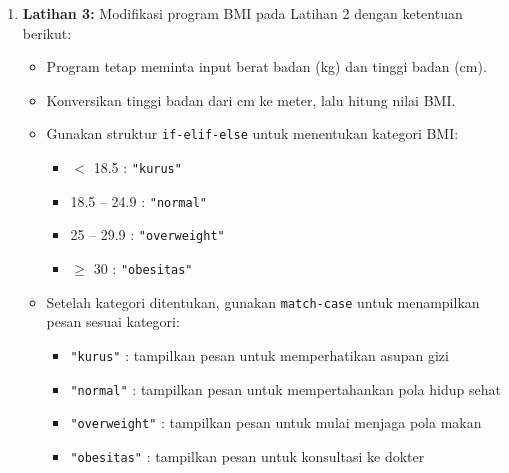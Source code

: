 \begin{enumerate}
\begin{itemize}
    \item Program meminta input berat badan (kg) dan tinggi badan (cm).
    \item Konversikan tinggi badan dari cm menjadi meter.
    \item Hitung nilai BMI menggunakan rumus di atas.
    \item Kategorikan hasilnya dengan \texttt{if-elif-else}:
    \begin{itemize}
        \item $<$ 18.5 : \texttt{Kurus}
        \item 18.5 -- 24.9 : \texttt{Normal}
        \item 25 -- 29.9 : \texttt{Overweight}
        \item $\geq$ 30 : \texttt{Obesitas}
    \end{itemize}
\end{itemize}

  \begin{promptterarah}
  Saya sedang membuat program penghitung BMI. Jangan tuliskan kodenya. Minta saya menuliskan rumus BMI dalam Python, lalu jelaskan bila urutan operasinya keliru. Setelah saya mengirim kode, periksa dan tunjukkan bagian yang keliru tanpa memberi kode yang benar.
  \end{promptterarah}
\item \textbf{Latihan 3:} Modifikasi program BMI pada Latihan 2 dengan ketentuan berikut:
\begin{itemize}
    \item Program tetap meminta input berat badan (kg) dan tinggi badan (cm).
    \item Konversikan tinggi badan dari cm ke meter, lalu hitung nilai BMI.
    \item Gunakan struktur \texttt{if-elif-else} untuk menentukan kategori BMI:
    \begin{itemize}
        \item $<$ 18.5 : \texttt{"kurus"}
        \item 18.5 -- 24.9 : \texttt{"normal"}
        \item 25 -- 29.9 : \texttt{"overweight"}
        \item $\geq$ 30 : \texttt{"obesitas"}
    \end{itemize}
    \item Setelah kategori ditentukan, gunakan \texttt{match-case} untuk menampilkan pesan sesuai kategori:
    \begin{itemize}
        \item \texttt{"kurus"} : tampilkan pesan untuk memperhatikan asupan gizi
        \item \texttt{"normal"} : tampilkan pesan untuk mempertahankan pola hidup sehat
        \item \texttt{"overweight"} : tampilkan pesan untuk mulai menjaga pola makan
        \item \texttt{"obesitas"} : tampilkan pesan untuk konsultasi ke dokter
    \end{itemize}
\end{itemize}



\end{enumerate}
